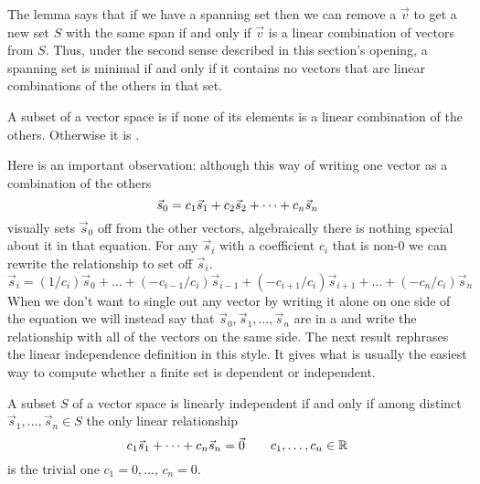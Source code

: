 The lemma says that if we have a spanning set 
then we can remove a $\vec{v}$ to get a new set $S$ 
with the same span if and only if
$\vec{v}$ is a linear combination of vectors from $S$.
Thus, under the second sense described in this section's opening, 
a spanning set is minimal
if and only if it contains
no vectors that are linear combinations of the others in that set.

\begin{definition}
\label{def:LinInd}
A subset of a vector space is
%
if none of its elements is a linear combination of the others.
Otherwise it is .
\end{definition}

Here is an important observation:
although this way of writing one vector as a combination of the others
\begin{equation*}
   \vec{s}_0=c_1\vec{s}_1+c_2\vec{s}_2+\cdots +c_n\vec{s}_n
\end{equation*}
visually sets \( \vec{s}_0 \) off from the other vectors, algebraically
there is nothing special about it in that equation.
For any \( \vec{s}_i \) with a coefficient $c_i$ that is non-$0$
we can rewrite the relationship to set off \( \vec{s}_i \).
\begin{equation*}
   \vec{s}_i=(1/c_i)\vec{s}_0+\dots
              +(-c_{i-1}/c_i)\vec{s}_{i-1}+(-c_{i+1}/c_i)\vec{s}_{i+1}
              +\dots+(-c_n/c_i)\vec{s}_n
\end{equation*}
When we don't want to single out any vector by writing it alone on
one side of the equation we will instead say that
\( \vec{s}_0,\vec{s}_1,\dots,\vec{s}_n \) are in a
%
and write the relationship
with all of the vectors on the same side.
The next result rephrases the linear independence definition in this style.
It gives what is usually the easiest way to compute whether
a finite set is dependent or independent.

\begin{lemma}   \label{le:LDIffANonTrivLinRel}
A subset \( S \) of a vector space is linearly independent if and only if 
among distinct \( \vec{s}_1,\dots,\vec{s}_n\in S \) 
the only linear relationship 
\begin{equation*}
   c_1\vec{s}_1+\dots+c_n\vec{s}_n=\vec{0}
   \qquad c_1,\dots,c_n\in\mathbb{R}
\end{equation*}
is the trivial one \( c_1=0,\dots,\,c_n=0 \).
\end{lemma}

